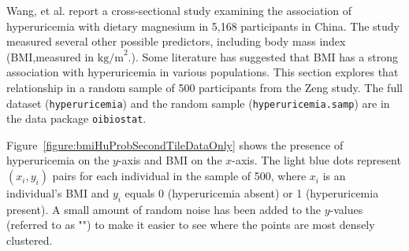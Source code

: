 Wang, et al. report a cross-sectional study examining the association of hyperuricemia with dietary magnesium in 5,168 participants in China. The study measured several other possible predictors, including body mass index (BMI,measured in  $\text{kg/m}^2$.).  Some literature has suggested that BMI has a strong association with hyperuricemia in various populations. This section explores that relationship in a random sample of 500 participants from the Zeng study. The full dataset (\texttt{hyperuricemia}) and the random sample (\texttt{hyperuricemia.samp}) are in the data package \texttt{oibiostat}.

 
Figure~\ref{figure:bmiHuProbSecondTileDataOnly} shows the presence  of hyperuricemia on the $y$-axis and BMI on the $x$-axis. The light blue dots represent $(x_i, y_i)$ pairs for each individual in the sample of 500, where $x_i$ is an individual's BMI and $y_i$ equals 0 (hyperuricemia absent) or 1 (hyperuricemia present). A small amount of random noise has been added to the $y$-values (referred to as "") to make it easier to see where the points are most densely clustered.
        
